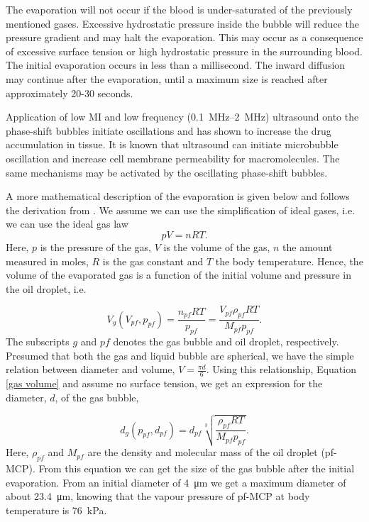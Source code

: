 The evaporation will not occur if the blood is under-saturated of the previously mentioned gases. Excessive hydrostatic pressure inside the bubble will reduce the pressure gradient and may halt the evaporation. This may occur as a consequence of excessive surface tension or high hydrostatic pressure in the surrounding blood. The initial evaporation occurs in less than a millisecond. The inward diffusion may continue after the evaporation, until a maximum size is reached after approximately 20-30 seconds\cite{Healey_pc}.


Application of low MI and low frequency (\SIrange{0.1}{2}{\mega\hertz}) ultrasound onto the phase-shift bubbles initiate oscillations and has shown to increase the drug accumulation in tissue\cite{wamel2014}. It is known that ultrasound can initiate microbubble oscillation and increase cell membrane permeability for macromolecules\cite{VanWamel2006a}. The same mechanisms may be activated by the oscillating phase-shift bubbles.

A more mathematical description of the evaporation is given below and follows the derivation from \citet{Healey2013}. We assume we can use the simplification of  ideal gases, i.e. we can use the ideal gas law
\begin{equation}
\label{ideal gas law}
 pV = nRT. 
\end{equation}  
Here, $p$ is the pressure of the gas, $V$ is the volume of the gas, $n$ the amount measured in moles, $R$ is the gas constant and $T$ the  body temperature. Hence, the volume of the evaporated gas is a function of the initial volume and pressure in the oil droplet, i.e.

\begin{equation}
\label{gas volume}
V_g(V_{pf}, p_{pf}) = \frac{n_{pf}RT}{p_{pf}}=\frac{V_{pf}\rho_{pf}RT}{M_{pf}p_{pf}}.
\end{equation}
The subscripts $g$ and $pf$ denotes the gas bubble and oil droplet, respectively. Presumed that both the gas and liquid bubble are spherical, we have the simple relation between diameter and volume, $V = \frac{\pi d}{6}$. Using this relationship, Equation \eqref{gas volume} and assume no surface tension, we get an expression for the diameter, $d$, of the gas bubble,  

\begin{equation}
\label{diameter}
d_g(p_{pf}, d_{pf}) = d_{pf}\sqrt[3]{\frac{\rho_{pf}RT}{M_{pf}p_{pf}}}.
\end{equation}
Here, $\rho_{pf}$ and $M_{pf}$ are the density and molecular mass of the oil droplet (pf-MCP). From this equation we can get the size of the gas bubble after the initial evaporation. From an initial diameter of \SI{4}{\micro\metre} we get a maximum diameter of about \SI{23.4}{\micro\metre}, knowing that the vapour pressure of pf-MCP at body temperature is \SI{76}{\kilo\pascal}\cite{Healey2013}.

